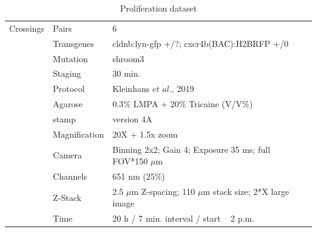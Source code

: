\documentclass[11pt,singlespacinge,twoside]{reedthesis} %
\theoremstyle{definition}
\theoremstyle{definition}
\theoremstyle{definition}
\theoremstyle{remark}
\begin{document}
\begin{table}[!h]

\caption{\label{tab:imgdatprol}Proliferation dataset}
\centering
\begin{tabu} to 
\toprule
{}  Crossings & Pairs & 6\\
 & Transgenes & cldnb:lyn-gfp +/?; cxcr4b(BAC):H2BRFP +/0\\

   & Mutation & shroom3\\

 & Staging & 30 min.\\

   & Protocol & Kleinhans $\textit{et al.}$, 2019\\

 & Agarose & 0.3$\%$ LMPA + 20$\%$ Tricaine (V/V$\%$)\\

   & stamp & version 4A\\

 & Magnification & 20X + 1.5x zoom\\

   & Camera & Binning 2x2; Gain 4; Exposure 35 ms; full FOV*150 $\mu$m\\

 & Channels & 651 nm (25$\%$)\\

   & Z-Stack & 2.5 $\mu$m Z-spacing; 110 $\mu$m stack size; 2*X large image\\

 & Time & 20 h / 7 min. interval / start ~ 2 p.m.\\
\bottomrule
\end{tabu}
\end{table}
\end{document}
